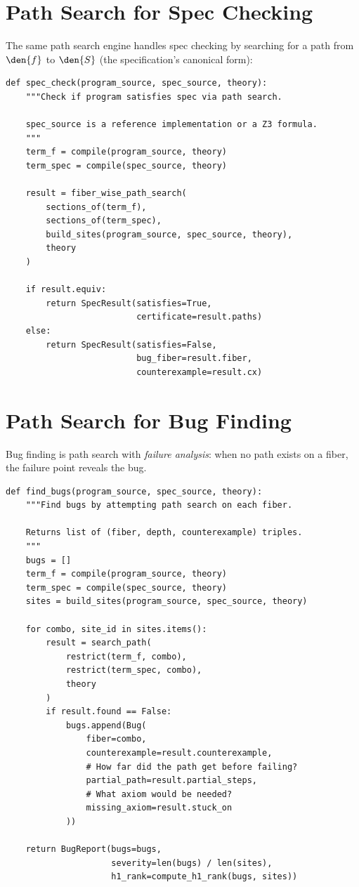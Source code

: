 \section{Path Search for Spec Checking}

The same path search engine handles spec checking by searching for
a path from $\den{f}$ to $\den{S}$ (the specification's canonical
form):

\begin{lstlisting}[caption={Spec check via path search}]
def spec_check(program_source, spec_source, theory):
    """Check if program satisfies spec via path search.

    spec_source is a reference implementation or a Z3 formula.
    """
    term_f = compile(program_source, theory)
    term_spec = compile(spec_source, theory)

    result = fiber_wise_path_search(
        sections_of(term_f),
        sections_of(term_spec),
        build_sites(program_source, spec_source, theory),
        theory
    )

    if result.equiv:
        return SpecResult(satisfies=True,
                          certificate=result.paths)
    else:
        return SpecResult(satisfies=False,
                          bug_fiber=result.fiber,
                          counterexample=result.cx)
\end{lstlisting}

\section{Path Search for Bug Finding}

Bug finding is path search with \emph{failure analysis}: when no
path exists on a fiber, the failure point reveals the bug.

\begin{lstlisting}[caption={Bug finding via failed path search}]
def find_bugs(program_source, spec_source, theory):
    """Find bugs by attempting path search on each fiber.

    Returns list of (fiber, depth, counterexample) triples.
    """
    bugs = []
    term_f = compile(program_source, theory)
    term_spec = compile(spec_source, theory)
    sites = build_sites(program_source, spec_source, theory)

    for combo, site_id in sites.items():
        result = search_path(
            restrict(term_f, combo),
            restrict(term_spec, combo),
            theory
        )
        if result.found == False:
            bugs.append(Bug(
                fiber=combo,
                counterexample=result.counterexample,
                # How far did the path get before failing?
                partial_path=result.partial_steps,
                # What axiom would be needed?
                missing_axiom=result.stuck_on
            ))

    return BugReport(bugs=bugs,
                     severity=len(bugs) / len(sites),
                     h1_rank=compute_h1_rank(bugs, sites))
\end{lstlisting}

